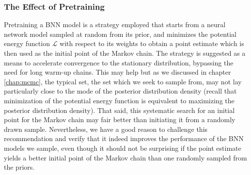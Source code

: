 \subsubsection{The Effect of Pretraining}
Pretraining a BNN model is a strategy employed that starts from a neural network model sampled at random from its prior, and minimizes the potential energy function $\mathcal{L}$ with respect to its weights to obtain a point estimate which is then used as the initial point of the Markov chain. The strategy is suggested as a means to accelerate convergence to the stationary distribution, bypassing the need for long warm-up chains. This may help but as we discussed in chapter \ref{chap:mcmc}, the typical set, the set which we seek to sample from, may not lay particularly close to the mode of the posterior distribution density (recall that minimization of the potential energy function is equivalent to maximizing the posterior distribution density). That said, this systematic search for an initial point for the Markov chain may fair better than initiating it from a randomly drawn sample. Nevertheless, we have a good reason to challenge this recommendation and verify that it indeed improves the performance of the BNN models we sample, even though it should not be surprising if the point estimate yields a better initial point of the Markov chain than one randomly sampled from the priors.

